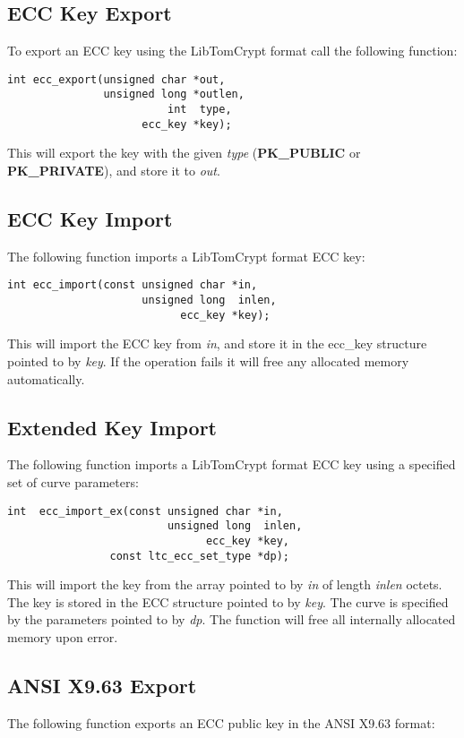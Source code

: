 \documentclass[synpaper]{book}
\begin{document}
\subsection{ECC Key Export}
To export an ECC key using the LibTomCrypt format call the following function:
\begin{verbatim}
int ecc_export(unsigned char *out,
               unsigned long *outlen,
                         int  type,
                     ecc_key *key);
\end{verbatim}
This will export the key with the given \textit{type} (\textbf{PK\_PUBLIC} or \textbf{PK\_PRIVATE}), and store it to \textit{out}.

\subsection{ECC Key Import}
The following function imports a LibTomCrypt format ECC key:
\begin{verbatim}
int ecc_import(const unsigned char *in,
                     unsigned long  inlen,
                           ecc_key *key);
\end{verbatim}
This will import the ECC key from \textit{in}, and store it in the ecc\_key structure pointed to by \textit{key}.  If the operation fails it will free
any allocated memory automatically.

\subsection{Extended Key Import}

The following function imports a LibTomCrypt format ECC key using a specified set of curve parameters:
\begin{verbatim}
int  ecc_import_ex(const unsigned char *in,
                         unsigned long  inlen,
                               ecc_key *key,
                const ltc_ecc_set_type *dp);
\end{verbatim}
This will import the key from the array pointed to by \textit{in} of length \textit{inlen} octets.  The key is stored in
the ECC structure pointed to by \textit{key}.  The curve is specified by the parameters pointed to by \textit{dp}.  The function will free
all internally allocated memory upon error.

\subsection{ANSI X9.63 Export}
The following function exports an ECC public key in the ANSI X9.63 format:
\end{document}
